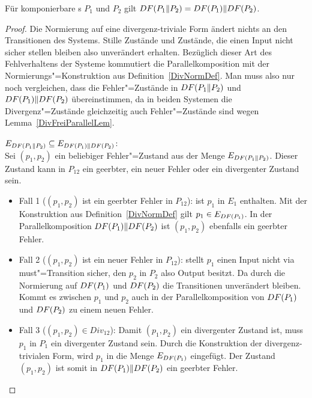 \begin{Lem}
  \label{ParallDivNormKommLem}
  Für komponierbare \MEIO{}s $P_1$ und $P_2$ gilt $DF (P_1\|P_2) = DF (P_1)\|
  DF (P_2)$.
\end{Lem}
\begin{proof}
  Die Normierung auf eine divergenz-triviale Form ändert nichts an den
  Transitionen des Systems. Stille Zustände und Zustände, die einen Input nicht
  sicher stellen bleiben also unverändert erhalten. Bezüglich dieser Art des
  Fehlverhaltens der Systeme kommutiert die Parallelkomposition mit der
  Normierungs"=Konstruktion aus Definition~\ref{DivNormDef}. Man muss also nur
  noch vergleichen, dass die Fehler"=Zustände in $DF (P_1\|P_2)$ und $DF
  (P_1)\| DF (P_2)$ übereinstimmen, da in beiden Systemen die
  Divergenz"=Zustände gleichzeitig auch Fehler"=Zustände sind wegen
  Lemma~\ref{DivFreiParallelLem}.

  $E_{DF (P_1\|P_2)} \subseteq E_{DF (P_1)\| DF (P_2)}$:\\
  Sei $(p_1,p_2)$ ein beliebiger Fehler"=Zustand aus der Menge $E_{DF
  (P_1\|P_2)}$. Dieser Zustand kann in $P_{12}$ ein geerbter, ein neuer Fehler
  oder ein divergenter Zustand sein.
  \begin{itemize}
    \item Fall 1 ($(p_1,p_2)$ ist ein geerbter Fehler in $P_{12}$): \OBdA{} ist
      $p_1$ in $E_1$ enthalten. Mit der Konstruktion aus
      Definition~\ref{DivNormDef} gilt $p_1\in E_{DF (P_1)}$. In der
      Parallelkomposition $DF (P_1)\|DF (P_2)$ ist $(p_1,p_2)$ ebenfalls ein
      geerbter Fehler.
    \item Fall 2 ($(p_1,p_2)$ ist ein neuer Fehler in $P_{12}$): \OBdA{} stellt
      $p_1$ einen Input nicht via must"=Transition sicher, den $p_2$ in $P_2$
      also Output besitzt. Da durch die Normierung auf $DF (P_1)$ und $DF
      (P_2)$ die Transitionen unverändert bleiben. Kommt es zwischen $p_1$ und
      $p_2$ auch in der Parallelkomposition von $DF (P_1)$ und $DF (P_2)$ zu
      einem neuen Fehler.
    \item Fall 3 ($(p_1,p_2)\in Div_{12}$): Damit $(p_1,p_2)$ ein divergenter
      Zustand ist, muss \oBdA{} $p_1$ in $P_1$ ein divergenter Zustand sein.
      Durch die Konstruktion der divergenz-trivialen Form, wird $p_1$ in die
      Menge $E_{DF (P_1)}$ eingefügt. Der Zustand $(p_1,p_2)$ ist somit in
      $DF (P_1)\|DF (P_2)$ ein geerbter Fehler.
  \end{itemize}


\end{proof}
